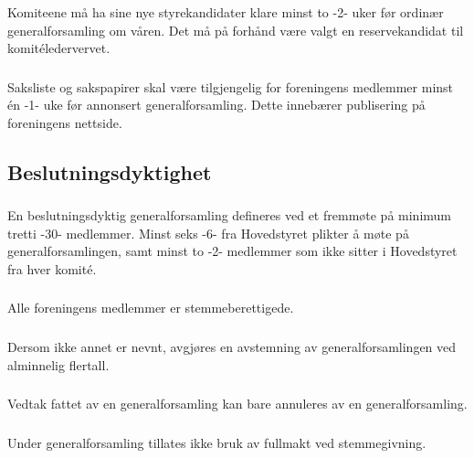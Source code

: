 \subsubsection{}
Komiteene må ha sine nye styrekandidater klare minst to -2- uker før ordinær
generalforsamling om våren. Det må på forhånd være valgt en reservekandidat til
komitéledervervet.

\subsubsection{}
Saksliste og sakspapirer skal være tilgjengelig for foreningens medlemmer minst
én -1- uke før annonsert generalforsamling. Dette innebærer publisering på
foreningens nettside.


\subsection{Beslutningsdyktighet}
\subsubsection{}
En beslutningsdyktig generalforsamling defineres ved et fremmøte på minimum
tretti -30- medlemmer. Minst seks -6- fra Hovedstyret plikter å møte på
generalforsamlingen, samt minst to -2- medlemmer som ikke sitter i Hovedstyret
fra hver komité.

\subsubsection{}
Alle foreningens medlemmer er stemmeberettigede.

\subsubsection{}
Dersom ikke annet er nevnt, avgjøres en avstemning av generalforsamlingen ved
alminnelig flertall.

\subsubsection{}
Vedtak fattet av en generalforsamling kan bare annuleres av en generalforsamling.

\subsubsection{}
Under generalforsamling tillates ikke bruk av fullmakt ved stemmegivning.

